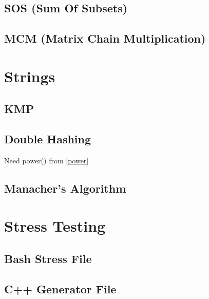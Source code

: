 \documentclass[10pt, a4paper]{article}
\begin{document}
\begin{multicols}{2}
\subsection{SOS (Sum \allowbreak Of Subsets)}


\subsection{MCM (Matrix \allowbreak Chain Multiplication)}



\section{Strings}

\subsection{KMP}


\subsection{Double Hashing}
Need power() from \ref{power}


\subsection{Manacher's Algorithm}


\section{Stress Testing}
\subsection{Bash Stress File}


\subsection{C++ Generator File}


\end{multicols}
\end{document}
